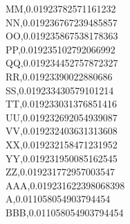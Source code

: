 \documentclass{article}
\begin{document}
MM,0.01923782571161232\\
NN,0.019236767239485857\\
OO,0.019235867538178363\\
PP,0.019235102792066992\\
QQ,0.019234452757872327\\
RR,0.01923390022880686\\
SS,0.019233430579101214\\
TT,0.019233031376851416\\
UU,0.019232692054939087\\
VV,0.019232403631313608\\
XX,0.019232158471231952\\
YY,0.019231950085162545\\
ZZ,0.019231772957003547\\
AAA,0.019231622398068398\\
A,0.011058054903794454\\
BBB,0.011058054903794454\\
        \newpage
\end{document}
